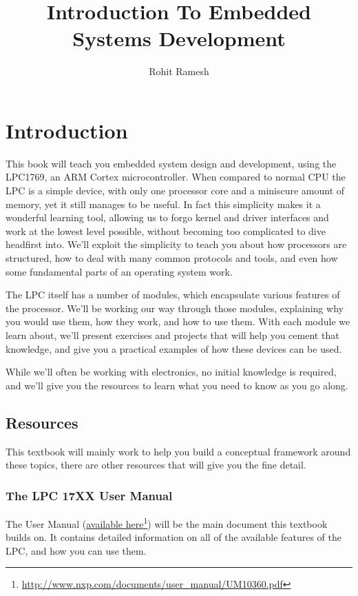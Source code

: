 \documentclass[]{article}
\title{Introduction To Embedded Systems Development}
\author{Rohit Ramesh}
\date{}
\begin{document}
\maketitle

{
\hypersetup{linkcolor=black}
\setcounter{tocdepth}{2}
\tableofcontents
}
\newpage

\section{Introduction}

This book will teach you embedded system design and development, using
the LPC1769, an ARM Cortex microcontroller. When compared to normal CPU
the LPC is a simple device, with only one processor core and a miniscure
amount of memory, yet it still manages to be useful. In fact this
simplicity makes it a wonderful learning tool, allowing us to forgo
kernel and driver interfaces and work at the lowest level possible,
without becoming too complicated to dive headfirst into. We'll exploit
the simplicity to teach you about how processors are structured, how to
deal with many common protocols and tools, and even how some fundamental
parts of an operating system work.

The LPC itself has a number of modules, which encapsulate various
features of the processor. We'll be working our way through those
modules, explaining why you would use them, how they work, and how to
use them. With each module we learn about, we'll present exercises and
projects that will help you cement that knowledge, and give you a
practical examples of how these devices can be used.

While we'll often be working with electronics, no initial knowledge is
required, and we'll give you the resources to learn what you need to
know as you go along.

\subsection{Resources}

This textbook will mainly work to help you build a conceptual framework
around these topics, there are other resources that will give you the
fine detail.

\subsubsection{The LPC 17XX User Manual}

The User Manual
(\href{http://www.nxp.com/documents/user_manual/UM10360.pdf}{available
here}\footnote{\url{http://www.nxp.com/documents/user_manual/UM10360.pdf}})
will be the main document this textbook builds on. It contains detailed
information on all of the available features of the LPC, and how you can
use them.
\end{document}
